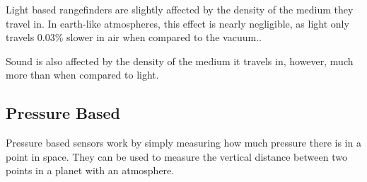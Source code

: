Light based rangefinders are slightly affected by the density of the medium they travel in. In earth-like atmospheres, this effect is nearly negligible, as light only travels 0.03\% slower in air when compared to the vacuum.\cite{refraction}.

Sound is also affected by the density of the medium it travels in, however, much more than when compared to light\cite{speedOfSound}.

\subsection{Pressure Based}
Pressure based sensors work by simply measuring how much pressure there is in a point in space. They can be used to measure the vertical distance between two points in a planet with an atmosphere\cite{barometric1}\cite{barometric2}.
